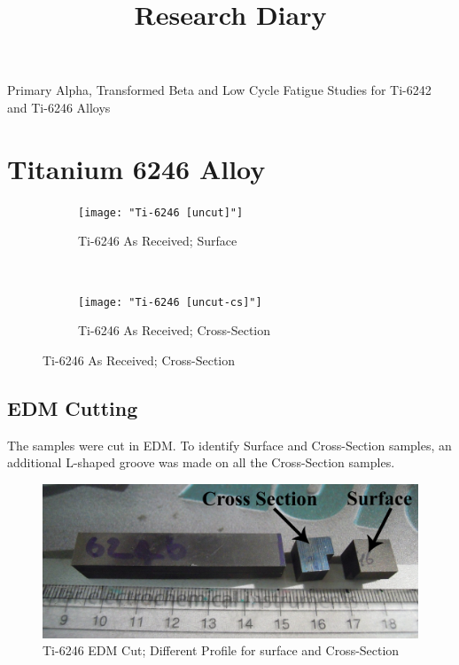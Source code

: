 \documentclass[11pt,letterpaper]{article}
\begin{document}
 
\graphicspath{{../Images/}} 





\title{Research Diary}

{\Huge Primary Alpha, Transformed Beta and Low Cycle Fatigue Studies for Ti-6242 and Ti-6246 Alloys}\\[5mm]

\section{Titanium 6246 Alloy} 

\begin{figure}[H]
    \centering
    \begin{subfigure}{0.40\textwidth}
        \texttt{[image: "Ti-6246 [uncut]"]}
        \caption{Ti-6246 As Received; Surface}
        \label{fig:2a}
    \end{subfigure}
    ~
    \begin{subfigure}{0.40\textwidth}
        \texttt{[image: "Ti-6246 [uncut-cs]"]}
        \caption{Ti-6246 As Received; Cross-Section}
        \label{fig:2b}
    \end{subfigure}
    \label{fig:As-Received}
\end{figure}


\subsection{EDM Cutting}
The samples were cut in EDM. To identify Surface and Cross-Section samples, an additional L-shaped groove was made on all the Cross-Section samples. 

\begin{figure}[H]
    \centering
        \includegraphics[width=\textwidth]{"Ti-6246 [cut-EDM]"}
        \caption{Ti-6246 EDM Cut; Different Profile for surface and Cross-Section}
    \label{fig:EDM-Cut}
\end{figure}
\end{document}
